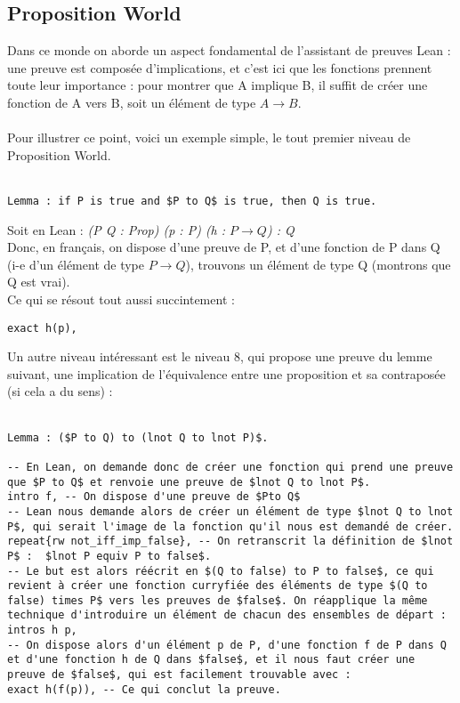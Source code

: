 \subsection{Proposition World}
Dans ce monde on aborde un aspect fondamental de l'assistant de preuves Lean : une preuve est composée d'implications, et c'est ici que les fonctions prennent toute leur importance : pour montrer que A implique B, il suffit de créer une fonction de A vers B, soit un élément de type $A \to B$.\\
\\
Pour illustrer ce point, voici un exemple simple, le tout premier niveau de Proposition World. \\ \\
\begin{verbatim}
Lemma : if P is true and $P to Q$ is true, then Q is true.
\end{verbatim}
Soit en Lean : \textit{(P Q : Prop) (p : P) (h : $P \to Q$) : Q} \\
Donc, en français, on dispose d'une preuve de P, et d'une fonction de P dans Q (i-e d'un élément de type $P \to Q$), trouvons un élément de type Q (montrons que Q est vrai). \\
Ce qui se résout tout aussi succintement : \\
\begin{verbatim} 
exact h(p), 
\end{verbatim}
Un autre niveau intéressant est le niveau 8, qui propose une preuve du lemme suivant, une implication de l'équivalence entre une proposition et sa contraposée (si cela a du sens) : \\
\\
\begin{verbatim}
Lemma : ($P to Q) to (lnot Q to lnot P)$. 

-- En Lean, on demande donc de créer une fonction qui prend une preuve que $P to Q$ et renvoie une preuve de $lnot Q to lnot P$.
intro f, -- On dispose d'une preuve de $Pto Q$ 
-- Lean nous demande alors de créer un élément de type $lnot Q to lnot P$, qui serait l'image de la fonction qu'il nous est demandé de créer.
repeat{rw not_iff_imp_false}, -- On retranscrit la définition de $lnot P$ :  $lnot P equiv P to false$.
-- Le but est alors réécrit en $(Q to false) to P to false$, ce qui revient à créer une fonction curryfiée des éléments de type $(Q to false) times P$ vers les preuves de $false$. On réapplique la même technique d'introduire un élément de chacun des ensembles de départ : 
intros h p,
-- On dispose alors d'un élément p de P, d'une fonction f de P dans Q et d'une fonction h de Q dans $false$, et il nous faut créer une preuve de $false$, qui est facilement trouvable avec : 
exact h(f(p)), -- Ce qui conclut la preuve. 
\end{verbatim}


